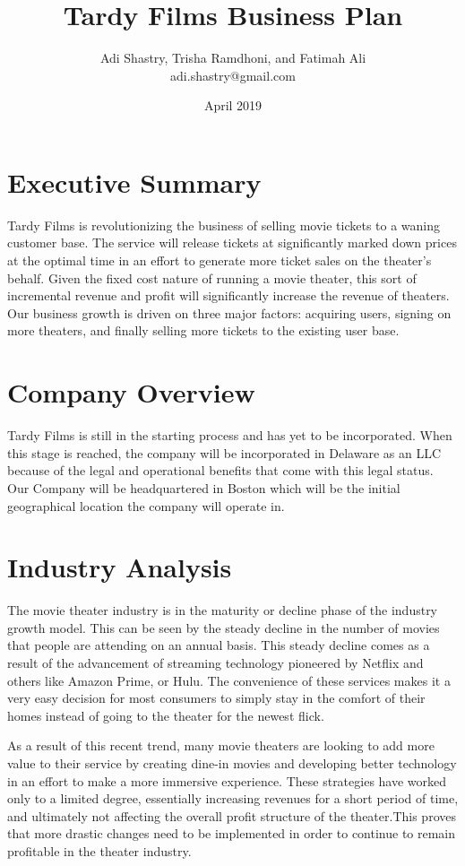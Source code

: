 \documentclass[12pt]{article}
\title{Tardy Films Business Plan}
\date{April 2019}
\author{Adi Shastry, Trisha Ramdhoni, and Fatimah Ali\\ adi.shastry@gmail.com}
\begin{document}
\maketitle
\newpage
\tableofcontents
\newpage
\doublespacing
\section{Executive Summary}
Tardy Films is revolutionizing the business of selling movie tickets to a waning customer base. The service will release tickets at significantly marked down prices at the optimal time in an effort to generate more ticket sales on the theater's behalf. Given the fixed cost nature of running a movie theater, this sort of incremental revenue and profit will significantly increase the revenue of theaters. Our business growth is driven on three major factors: acquiring users, signing on more theaters, and finally selling more tickets to the existing user base. 

\newpage
\section{Company Overview}
Tardy Films is still in the starting process and has yet to be incorporated. When this stage is reached, the company will be incorporated in Delaware as an LLC because of the legal and operational benefits that come with this legal status. Our Company will be headquartered in Boston which will be the initial geographical location the company will operate in. 

\section{Industry Analysis}
The movie theater industry is in the maturity or decline phase of the industry growth model. This can be seen by the steady decline in the number of movies that people are attending on an annual basis. This steady decline comes as a result of the advancement of streaming technology pioneered by Netflix and others like Amazon Prime, or Hulu. The convenience of these services makes it a very easy decision for most consumers to simply stay in the comfort of their homes instead of going to the theater for the newest flick. 

As a result of this recent trend, many movie theaters are looking to add more value to their service by creating dine-in movies and developing better technology in an effort to make a more immersive experience. These strategies have worked only to a limited degree, essentially increasing revenues for a short period of time, and ultimately not affecting the overall profit structure of the theater.This proves that more drastic changes need to be implemented in order to continue to remain profitable in the theater industry.
\end{document}
